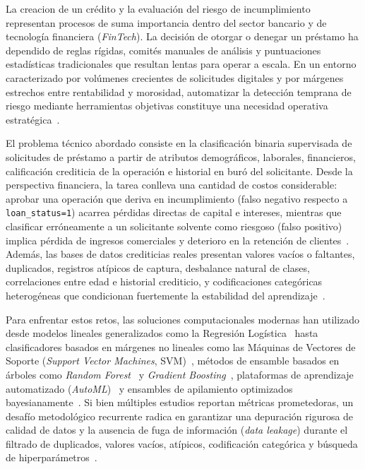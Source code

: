\documentclass[conference]{IEEEtran}
\begin{document}
La creacion de un crédito y la evaluación del riesgo de incumplimiento representan procesos de suma importancia dentro del sector bancario y de tecnología financiera (\textit{FinTech}). La decisión de otorgar o denegar un préstamo ha dependido de reglas rígidas, comités manuales de análisis y puntuaciones estadísticas tradicionales que resultan lentas para operar a escala. En un entorno caracterizado por volúmenes crecientes de solicitudes digitales y por márgenes estrechos entre rentabilidad y morosidad, automatizar la detección temprana de riesgo mediante herramientas objetivas constituye una necesidad operativa estratégica~\cite{pucar2026consumer,lin2026automl}.

El problema técnico abordado consiste en la clasificación binaria supervisada de solicitudes de préstamo a partir de atributos demográficos, laborales, financieros, calificación crediticia de la operación e historial en buró del solicitante. Desde la perspectiva financiera, la tarea conlleva una cantidad de costos considerable: aprobar una operación que deriva en incumplimiento (falso negativo respecto a \texttt{loan\_status=1}) acarrea pérdidas directas de capital e intereses, mientras que clasificar erróneamente a un solicitante solvente como riesgoso (falso positivo) implica pérdida de ingresos comerciales y deterioro en la retención de clientes~\cite{pucar2026consumer}. Además, las bases de datos crediticias reales presentan valores vacíos o faltantes, duplicados, registros atípicos de captura, desbalance natural de clases, correlaciones entre edad e historial crediticio, y codificaciones categóricas heterogéneas que condicionan fuertemente la estabilidad del aprendizaje~\cite{maurino2025dataquality,bolikulov2024categorical}.

Para enfrentar estos retos, las soluciones computacionales modernas han utilizado desde modelos lineales generalizados como la Regresión Logística~\cite{cox1958regression} hasta clasificadores basados en márgenes no lineales como las Máquinas de Vectores de Soporte (\textit{Support Vector Machines}, SVM)~\cite{cortes1995support}, métodos de ensamble basados en árboles como \textit{Random Forest}~\cite{breiman2001random} y \textit{Gradient Boosting}~\cite{pucar2026consumer}, plataformas de aprendizaje automatizado (\textit{AutoML})~\cite{lin2026automl} y ensambles de apilamiento optimizados bayesianamente~\cite{mahmud2025stacking}. Si bien múltiples estudios reportan métricas prometedoras, un desafío metodológico recurrente radica en garantizar una depuración rigurosa de calidad de datos y la ausencia de fuga de información (\textit{data leakage}) durante el filtrado de duplicados, valores vacíos, atípicos, codificación categórica y búsqueda de hiperparámetros~\cite{maurino2025dataquality,bolikulov2024categorical}.
\end{document}
